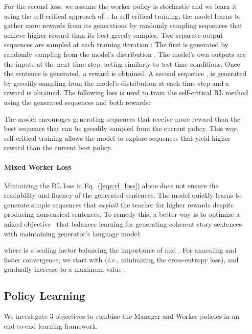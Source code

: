 \documentclass[letterpaper]{article} \usepackage{aaai19}  \usepackage{times}  \usepackage{helvet}  \usepackage{courier}  \usepackage{url}  \usepackage{graphicx}
\begin{document}
For the second loss, we assume the worker policy is stochastic and we learn it using the self-critical approach of~\cite{Rennie2016Self}. 
In self critical training, the model learns to gather more rewards from its generations by randomly sampling sequences that achieve higher reward than its best greedy samples. Two separate output sequences are sampled at each training iteration : The first  is generated by randomly sampling from the model's distribution . The model's own outputs are the inputs at the next time step, acting similarly to test time conditions. Once the sentence is generated, a reward  is obtained. A second sequence , is generated by greedily sampling from the model's distribution  at each time step  and a reward  is obtained. The following loss is used to train the self-critical RL method using the generated sequences and both rewards:

\begin{adjustbox}{minipage=1.10\linewidth,scale=0.88}
	 
\end{adjustbox}
The model encourages generating sequences that receive more reward than the best sequence that can be greedily sampled from the current policy. This way, self-critical training allows the model to explore sequences that yield higher reward than the current best policy. 
\paragraph{Mixed Worker Loss}
Minimizing the RL loss in Eq.~(\ref{eqn:rl_loss}) alone does not ensure the readability and fluency of the generated sentences. The model quickly learns to generate simple sequences that \textit{exploit} the teacher for higher rewards despite producing nonsensical sentences. To remedy this, a better way is to optimize a mixed objective~\cite{wu2016google,Pasunuru2017Reinforced} that balances learning for generating coherent story sentences with maintaining generator's language model:

where  is a scaling factor balancing the importance of  and . 
For annealing and faster convergence, we start with  (\emph{i.e.}, minimizing the cross-entropy loss), and gradually increase  to a maximum value .
\subsection{Policy Learning} \label{subsec:End-to-EndTraining}
We investigate 3 objectives to combine the Manager and Worker policies in an end-to-end learning framework. 
\end{document}
